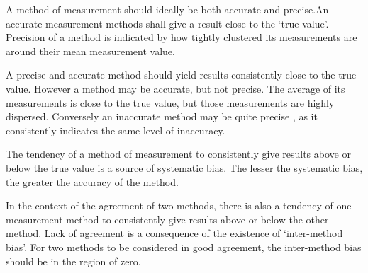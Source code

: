 \documentclass{report}
\begin{document}

A method of measurement should ideally be both accurate and
precise.An accurate measurement methods shall give a result close
to the `true value'. Precision of a method is indicated by how
tightly clustered its measurements are around their mean
measurement value.

\newpage

A precise and accurate method should yield results consistently
close to the true value. However a method may be accurate, but not
precise. The average of its measurements is close to the true
value, but those measurements are highly dispersed. Conversely an
inaccurate method may be quite precise , as it consistently
indicates the same level of inaccuracy.

The tendency of a method of measurement to consistently give
results above or below the true value is a source of systematic
bias. The lesser the systematic bias, the greater the accuracy of
the method.

In the context of the agreement of two methods, there is also a
tendency of one measurement method to consistently give results
above or below the other method. Lack of agreement is a
consequence of the existence of `inter-method bias'. For two
methods to be considered in good agreement, the inter-method bias
should be in the region of zero.
\end{document}
